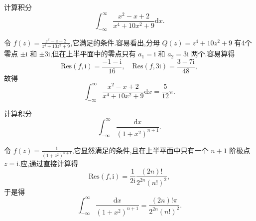 \documentclass[../../main.tex]{subfiles}
\begin{document}
\begin{example}
计算积分
\[
\int_{-\infty}^{\infty} \frac{x^2 - x + 2}{x^4 + 10x^2 + 9} \mathrm{d}x.
\]
\end{example}
\begin{solution}
令 \( f(z) = \frac{z^2 - z + 2}{z^4 + 10z^2 + 9} \),它满足的条件.容易看出,分母 \( Q(z) = z^4 + 10z^2 + 9 \) 有4个零点 \( \pm \mathrm{i} \) 和 \( \pm 3\mathrm{i} \),但在上半平面中的零点只有 \( a_1 = \mathrm{i} \) 和 \( a_2 = 3\mathrm{i} \) 两个.容易算得
\[
\mathrm{Res}(f, \mathrm{i}) = \frac{-1 - \mathrm{i}}{16},
\quad
\mathrm{Res}(f, 3\mathrm{i}) = \frac{3 - 7\mathrm{i}}{48},
\]
故得
\[
\int_{-\infty}^{\infty} \frac{x^2 - x + 2}{x^4 + 10x^2 + 9} \mathrm{d}x = \frac{5}{12}\pi.
\]
\end{solution}

\begin{example}
计算积分
\[
\int_{-\infty}^{\infty} \frac{\mathrm{d}x}{(1 + x^2)^{n + 1}}.
\]
\end{example}
\begin{solution}
令 \( f(z) = \frac{1}{(1 + z^2)^{n + 1}} \),它显然满足的条件,且在上半平面中只有一个 \( n + 1 \) 阶极点 \( z = \mathrm{i} \).应,通过直接计算得
\[
\mathrm{Res}(f, \mathrm{i}) = \frac{1}{2\mathrm{i}} \frac{(2n)!}{2^{2n} (n!)^2},
\]
于是得
\[
\int_{-\infty}^{\infty} \frac{\mathrm{d}x}{(1 + x^2)^{n + 1}} = \frac{(2n)! \pi}{2^{2n} (n!)^2}.
\]
\end{solution}
\end{document}
